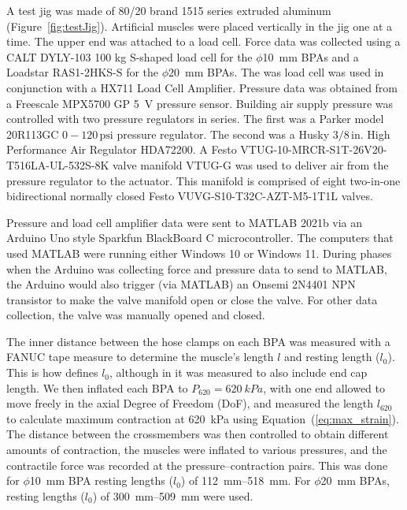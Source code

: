 A test jig was made of 80/20 brand 1515 series extruded aluminum (Figure~\ref{fig:testJig}). Artificial muscles were placed vertically in the jig one at a time. The upper end was attached to a load cell.
Force data was collected using a CALT DYLY-103 100 kg S-shaped load cell for the $\phi$\qty{10}{\mm} BPAs and a Loadstar RAS1-2HKS-S for the $\phi$\qty{20}{\mm} BPAs. The was load cell was used in conjunction with a HX711 Load Cell Amplifier. Pressure data was obtained from a Freescale MPX5700 GP \qty{5}{\volt} pressure sensor. Building air supply pressure was controlled with two pressure regulators in series. The first was a Parker model 20R113GC $0-120\,\text{psi}$ pressure regulator. The second was a Husky $3/8\,\text{in.}$ High Performance Air Regulator HDA72200. A Festo VTUG-10-MRCR-S1T-26V20-T516LA-UL-532S-8K valve manifold VTUG-G was used to deliver air from the pressure regulator to the actuator. This manifold is comprised of eight two-in-one bidirectional normally closed Festo VUVG-S10-T32C-AZT-M5-1T1L valves. 

Pressure and load cell amplifier data were sent to MATLAB 2021b via an Arduino Uno style Sparkfun BlackBoard C microcontroller. The computers that used MATLAB were running either Windows 10 or Windows 11. During phases when the Arduino was collecting force and pressure data to send to MATLAB, the Arduino would also trigger (via MATLAB) an Onsemi 2N4401 NPN transistor to make the valve manifold open or close the valve. For other data collection, the valve was manually opened and closed. %

The inner distance between the hose clamps on each BPA was measured with a FANUC tape measure to determine the muscle's length $l$ and resting length ($l_0$). This is how \citet{festo_2026} defines $l_0$, although in \citet{hunt_modeling_2017} it was measured to also include end cap length. We then inflated each BPA to $P_{620}=\qty{620}{kPa}$, with one end allowed to move freely in the axial Degree of Freedom (DoF), and measured the length $l_{620}$ to calculate maximum contraction at \qty{620}{\kPa} using Equation~(\ref{eq:max_strain}). The distance between the crossmembers was then controlled to obtain different amounts of contraction, the muscles were inflated to various pressures, and the contractile force was recorded at the pressure--contraction pairs. This was done for $\phi$\qty{10}{\mm} BPA resting lengths ($l_0$) of \SIrange[range-phrase=--]{112}{518}{\mm}. For $\phi$\qty{20}{\mm} BPAs, resting lengths ($l_0$) of \SIrange[range-phrase=--]{300}{509}{\mm} were used.

